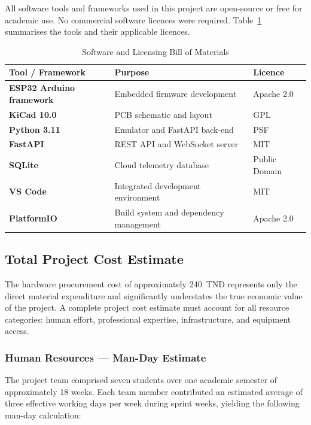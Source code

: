 All software tools and frameworks used in this project are open-source or free for academic use. No commercial software licences were required. Table~\ref{tab:software-bom} summarises the tools and their applicable licences.

\begin{table}[H]
\centering
\caption{Software and Licensing Bill of Materials}
\label{tab:software-bom}
\begin{tabular}{>{\bfseries}p{4.0cm} p{6.0cm} l}
\toprule
Tool / Framework & Purpose & Licence \\
\midrule
ESP32 Arduino framework & Embedded firmware development & Apache 2.0 \\
KiCad 10.0              & PCB schematic and layout      & GPL \\
Python 3.11             & Emulator and FastAPI back-end & PSF \\
FastAPI                 & REST API and WebSocket server & MIT \\
SQLite                  & Cloud telemetry database      & Public Domain \\
VS Code                 & Integrated development environment & MIT \\
PlatformIO              & Build system and dependency management & Apache 2.0 \\
\bottomrule
\end{tabular}
\end{table}

\subsection{Total Project Cost Estimate}

The hardware procurement cost of approximately 240~TND represents only the direct material expenditure and significantly understates the true economic value of the project. A complete project cost estimate must account for all resource categories: human effort, professional expertise, infrastructure, and equipment access.

\subsubsection*{Human Resources --- Man-Day Estimate}

The project team comprised seven students over one academic semester of approximately 18 weeks. Each team member contributed an estimated average of three effective working days per week during sprint weeks, yielding the following man-day calculation:

